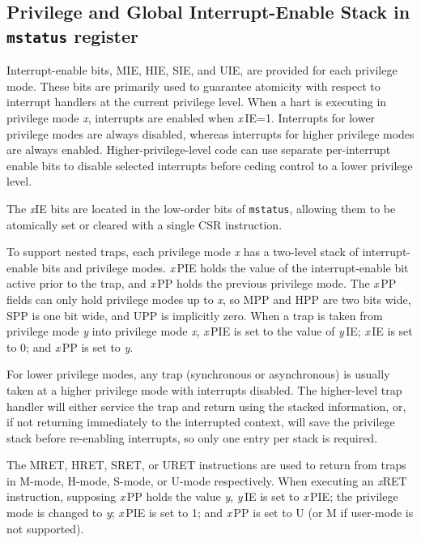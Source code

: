 \subsection{Privilege and Global Interrupt-Enable Stack in {\tt mstatus} register}
\label{privstack}

Interrupt-enable bits, MIE, HIE, SIE, and UIE, are provided for each privilege
mode.  These bits are primarily used to guarantee atomicity with respect to
interrupt handlers at the current privilege level.  When a hart is executing
in privilege mode {\em x}, interrupts are enabled when {\em x}\,IE=1.
Interrupts for lower privilege modes are always disabled, whereas interrupts
for higher privilege modes are always enabled.  Higher-privilege-level code
can use separate per-interrupt enable bits to disable selected interrupts
before ceding control to a lower privilege level.

\begin{commentary}
The {\em x}IE bits are located in the low-order bits of {\tt mstatus},
allowing them to be atomically set or cleared with a single CSR instruction.
\end{commentary}

To support nested traps, each privilege mode {\em x} has a two-level
stack of interrupt-enable bits and privilege modes.  {\em x}\,PIE
holds the value of the interrupt-enable bit active prior to the trap,
and {\em x}\,PP holds the previous privilege mode.  The {\em x}\,PP
fields can only hold privilege modes up to {\em x}, so MPP and HPP are
two bits wide, SPP is one bit wide, and UPP is implicitly zero.  When
a trap is taken from privilege mode {\em y} into privilege mode {\em
  x}, {\em x}\,PIE is set to the value of {\em y}\,IE; {\em x}\,IE is set to
0; and {\em x}\,PP is set to {\em y}.

\begin{commentary}
For lower privilege modes, any trap (synchronous or asynchronous) is
usually taken at a higher privilege mode with interrupts disabled.
The higher-level trap handler will either service the trap and return
using the stacked information, or, if not returning immediately to the
interrupted context, will save the privilege stack before re-enabling
interrupts, so only one entry per stack is required.
\end{commentary}

The MRET, HRET, SRET, or URET instructions are used to return from
traps in M-mode, H-mode, S-mode, or U-mode respectively.  When
executing an {\em x}RET instruction, supposing {\em x}\,PP holds the
value {\em y}, {\em y}\,IE is set to {\em x}\,PIE; the privilege mode
is changed to {\em y}; {\em x}\,PIE is set to 1; and {\em x}\,PP is
set to U (or M if user-mode is not supported).

